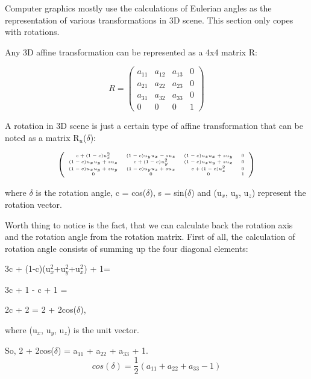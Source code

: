\documentclass[times, 10pt,twocolumn]{article}
\begin{document}
Computer graphics mostly use the calculations of Eulerian angles as the representation of various transformations in 3D scene. This section only copes with rotations.

Any 3D affine transformation can be represented as a 4x4 matrix R:

\[ R = \left( \begin{array}{cccc}
a_{11} & a_{12} & a_{13} & 0 \\
a_{21} & a_{22} & a_{23} & 0 \\
a_{31} & a_{32} & a_{33} & 0 \\
0 & 0 & 0 & 1
\end{array} \right)\]

A rotation in 3D scene is just a certain type of affine transformation that can be noted as a matrix R$_{u}$($\delta$):

\[ \left( \begin{tiny}\begin{array}{cccc}
c+(1-c)u_{x}^{2} & (1-c)u_{y}u_{x}-su_{z} & (1-c)u_{z}u_{x}+su_{y} & 0 \\
(1-c)u_{x}u_{y}+su_{z} & c+(1-c)u_{y}^{2} & (1-c)u_{z}u_{y}+su_{x} & 0 \\
(1-c)u_{x}u_{y}+su_{y} & (1-c)u_{y}u_{z}+su_{x} & c+(1-c)u_{z}^{2} & 0 \\
0 & 0 & 0 & 1
\end{array}\end{tiny} \right)\]

where $\delta$ is the rotation angle, c = cos($\delta$), s = sin($\delta$) and (u$_{x}$, u$_{y}$, u$_{z}$) represent the rotation vector.

Worth thing to notice is the fact, that we can calculate back the rotation axis and the rotation angle from the rotation matrix. First of all, the calculation of rotation angle consists of summing up the four diagonal elements:
\begin{description}
    \setlength{\itemsep}{0pt}

    \item 3c + (1-c)(u$_{x}^{2}$+u$_{y}^2$+u$_{x}^{2}$) + 1=
    \item 3c + 1 - c + 1 =
    \item 2c + 2 = 2 + 2cos($\delta$),
\end{description}
where (u$_{x}$, u$_{y}$, u$_{z}$) is the unit vector.

So, 2 + 2cos($\delta$) = a$_{11}$ + a$_{22}$  + a$_{33}$ + 1.
\begin{equation}
\label{eq_cosdelta}
cos(\delta) = \frac{1}{2}(a_{11} + a_{22}  + a_{33} - 1)
\end{equation}
\end{document}
